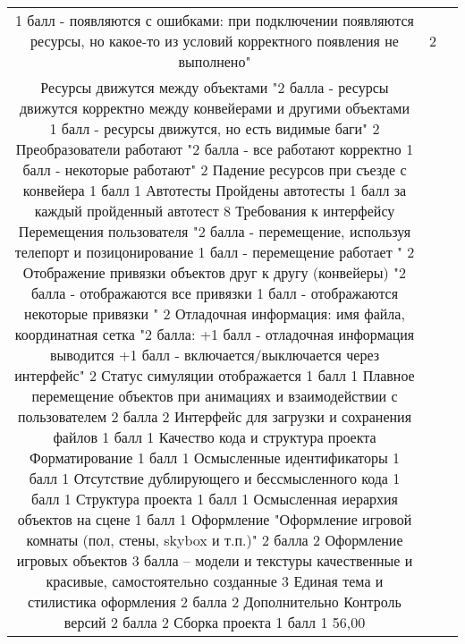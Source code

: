 \begin{tabular}{|c|c|c|}
    1 балл - появляются с ошибками: при подключении появляются ресурсы, но какое-то из условий корректного появления не выполнено" & 2 \\
Ресурсы движутся между объектами	"2 балла - ресурсы движутся корректно между конвейерами и другими объектами
1 балл - ресурсы движутся, но есть видимые баги"	2
Преобразователи работают	"2 балла - все работают корректно
1 балл - некоторые работают"	2
Падение ресурсов при съезде с конвейера	1 балл	1
Автотесты		
Пройдены автотесты	1 балл за каждый пройденный автотест	8
Требования к интерфейсу		
Перемещения пользователя	"2 балла - перемещение, используя телепорт и позицонирование
1 балл - перемещение работает
"	2
Отображение привязки объектов друг к другу (конвейеры)	"2 балла - отображаются все привязки
1 балл - отображаются некоторые привязки
"	2
Отладочная информация: имя файла, координатная сетка	"2 балла:
+1 балл - отладочная информация выводится
+1 балл - включается/выключается через интерфейс"	2
Статус симуляции отображается	1 балл	1
Плавное перемещение объектов при анимациях и взаимодействии с пользователем	2 балла	2
Интерфейс для загрузки и сохранения файлов	1 балл	1
Качество кода и структура проекта		
Форматирование	1 балл	1
Осмысленные идентификаторы	1 балл	1
Отсутствие дублирующего и бессмысленного кода	1 балл	1
Структура проекта	1 балл	1
Осмысленная иерархия объектов на сцене	1 балл	1
Оформление		
"Оформление игровой комнаты
(пол, стены, skybox и т.п.)"	2 балла	2
Оформление игровых объектов	3 балла -- модели и текстуры качественные и красивые, самостоятельно созданные	3
Единая тема и стилистика оформления	2 балла	2
Дополнительно		
Контроль версий	2 балла	2
Сборка проекта	1 балл	1 56,00
\end{tabular}